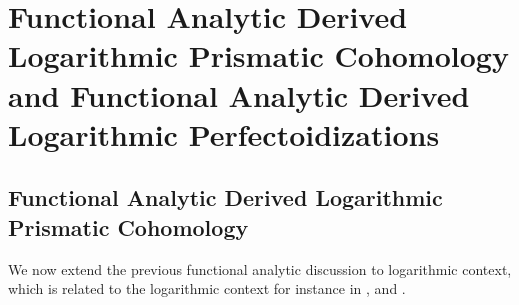 \documentclass[11pt]{book}
\theoremstyle{definition}
\numberwithin{equation}{section}
\begin{document}
\newpage

\section{Functional Analytic Derived Logarithmic Prismatic Cohomology and Functional Analytic Derived Logarithmic Perfectoidizations}

\subsection{Functional Analytic Derived Logarithmic Prismatic Cohomology}


\indent We now extend the previous functional analytic discussion to logarithmic context, which is related to the logarithmic context for instance in \cite[Chapter 8]{12O}, \cite[Chapter 5, Chapter 6, Chapter 7]{12B1} and \cite{12Ko1}.
\end{document}
